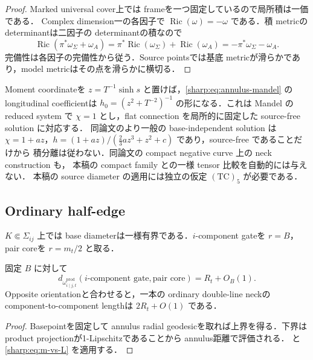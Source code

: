 \documentclass[a4paper,11pt]{ltjsarticle}
\numberwithin{equation}{section}
\theoremstyle{plain}
\theoremstyle{definition}
\theoremstyle{remark}
\newcommand{\Ric}{\operatorname{Ric}}\newcommand{\tr}{\operatorname{tr}}\newcommand{\osc}{\operatorname{osc}}\newcommand{\vol}{\operatorname{Vol}}
\begin{document}
\begin{proof}
Marked universal cover上では frameを一つ固定しているので局所積は一価である．
Complex dimension一の各因子で $\Ric(\omega)=-\omega$ である．積 metricの determinantは二因子の determinantの積なので
\[
 \Ric(\pi^*\omega_{\Sigma}+\omega_A)
 =\pi^*\Ric(\omega_{\Sigma})+\Ric(\omega_A)
 =-\pi^*\omega_{\Sigma}-\omega_A.
\]
完備性は各因子の完備性から従う．Source pointsでは基底 metricが滑らかであり，model metricはその点を滑らかに横切る．
\end{proof}

\begin{remark}
Moment coordinateを $z=T^{-1}\sinh s$ と置けば，\eqref{sharp:eq:annulus-mandel} の longitudinal coefficientは
$h_0=(z^2+T^{-2})^{-1}$ の形になる．これは
Mandel\cite[\S2.3, equation~(2.13)]{Mandel} の reduced system で
$\chi=1$ とし，flat connection を局所的に固定した source-free solution に対応する．
同論文のより一般の base-independent solution は
$\chi=1+az$，$h=(1+az)/(\frac23az^3+z^2+c)$ であり，source-free であることだけから
積分離は従わない．同論文の compact negative curve 上の neck construction も，
本稿の compact family との一様 tensor 比較を自動的には与えない．
本稿の source diameter の適用には独立の仮定 $\mathrm{(TC)}_5$ が必要である．
\end{remark}

\subsection{Ordinary half-edge}

$K\Subset\Sigma_{ij}$ 上では base diameterは一様有界である．$i$-component gateを $r=B$，pair coreを $r=m_t/2$ と取る．

\begin{corollary}\label{sharp:cor:half-edge-one}
固定 $B$ に対して
\begin{equation}\label{sharp:eq:half-edge-length}
 d_{\omega_{i\mid j,t}^{\mathrm{prod}}}
 (\text{$i$-component gate},\text{pair core})
 =R_t+O_B(1).
\end{equation}
Opposite orientationと合わせると，一本の ordinary double-line neckの component-to-component lengthは
$2R_t+O(1)$ である．
\end{corollary}

\begin{proof}
Basepointを固定して annulus radial geodesicを取れば上界を得る．下界は product projectionが1-Lipschitzであることから annulus距離で評価される．
 と \eqref{sharp:eq:m-vs-L} を適用する．
\end{proof}
\end{document}
